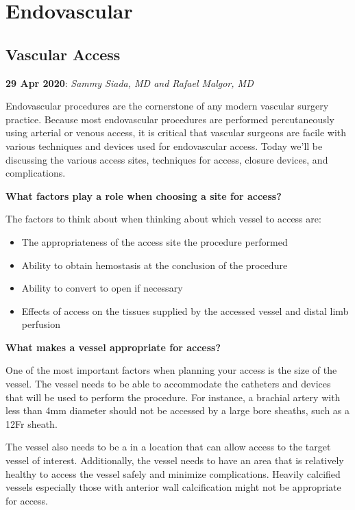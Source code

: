 \documentclass[
]{book}
\begin{document}
\hypertarget{endovascular}{%
\chapter{Endovascular}\label{endovascular}}

\hypertarget{vascular-access}{%
\section{Vascular Access}\label{vascular-access}}

\textbf{29 Apr 2020}: \emph{Sammy Siada, MD and Rafael Malgor, MD}

Endovascular procedures are the cornerstone of any modern vascular
surgery practice. Because most endovascular procedures are performed
percutaneously using arterial or venous access, it is critical that
vascular surgeons are facile with various techniques and devices used
for endovascular access. Today we'll be discussing the various access
sites, techniques for access, closure devices, and complications.

\textbf{What factors play a role when choosing a site for access?}

The factors to think about when thinking about which vessel to access
are:

\begin{itemize}
\item
  The appropriateness of the access site the procedure performed
\item
  Ability to obtain hemostasis at the conclusion of the procedure
\item
  Ability to convert to open if necessary
\item
  Effects of access on the tissues supplied by the accessed vessel and
  distal limb perfusion
\end{itemize}

\textbf{What makes a vessel appropriate for access?}

One of the most important factors when planning your access is the size
of the vessel. The vessel needs to be able to accommodate the catheters
and devices that will be used to perform the procedure. For instance, a
brachial artery with less than 4mm diameter should not be accessed by a
large bore sheaths, such as a 12Fr sheath.

The vessel also needs to be a in a location that can allow access to the
target vessel of interest. Additionally, the vessel needs to have an
area that is relatively healthy to access the vessel safely and minimize
complications. Heavily calcified vessels especially those with anterior
wall calcification might not be appropriate for access.
\end{document}
